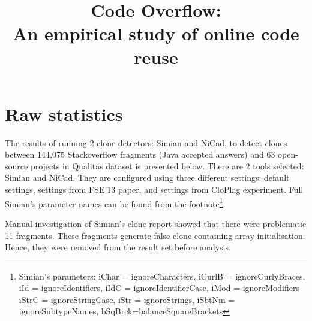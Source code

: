 \documentclass{IEEEtran}
\begin{document}
\onecolumn

\title{Code Overflow: \\
	An empirical study of online code reuse}
\maketitle

\section*{Raw statistics}
The results of running 2 clone detectors: Simian and NiCad, to detect clones between 144,075 Stackoverflow fragments (Java accepted answers) and 63 open-source projects in Qualitas dataset is presented below. There are 2 tools selected: Simian and NiCad. They are configured using three different settings: default settings, settings from FSE'13 paper, and settings from CloPlag experiment. Full Simian's parameter names can be found from the footnote\footnote{Simian's parameters: iChar = ignoreCharacters, iCurlB = ignoreCurlyBraces, iId = ignoreIdentifiers, iIdC = ignoreIdentifierCase, iMod = ignoreModifiers \newline iStrC = ignoreStringCase, iStr = ignoreStrings, iSbtNm = ignoreSubtypeNames, bSqBrck=balanceSquareBrackets}. 

Manual investigation of Simian's clone report showed that there were problematic 11 fragments. These fragments generate false clone containing array initialisation. Hence, they were removed from the result set before analysis.
\end{document}
